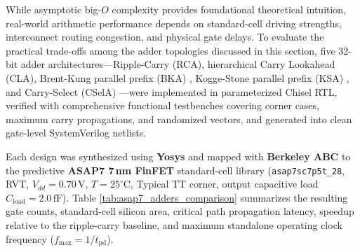 While asymptotic big-$O$ complexity provides foundational theoretical intuition, real-world arithmetic performance depends on standard-cell driving strengths, interconnect routing congestion, and physical gate delays. To evaluate the practical trade-offs among the adder topologies discussed in this section, five 32-bit adder architectures---Ripple-Carry (RCA), hierarchical Carry Lookahead (CLA), Brent-Kung parallel prefix (BKA) \cite{brent1982regular}, Kogge-Stone parallel prefix (KSA) \cite{kogge1973parallel}, and Carry-Select (CSelA) \cite{bedrij1962}---were implemented in parameterized Chisel RTL, verified with comprehensive functional testbenches covering corner cases, maximum carry propagations, and randomized vectors, and generated into clean gate-level SystemVerilog netlists.

Each design was synthesized using \textbf{Yosys} and mapped with \textbf{Berkeley ABC} to the predictive \textbf{ASAP7 7\,nm FinFET} standard-cell library (\texttt{asap7sc7p5t\_28}, RVT, $V_{dd} = 0.70\,\text{V}$, $T = 25^\circ\text{C}$, Typical TT corner, output capacitive load $C_{\text{load}} = 2.0\,\text{fF}$). Table \ref{tab:asap7_adders_comparison} summarizes the resulting gate counts, standard-cell silicon area, critical path propagation latency, speedup relative to the ripple-carry baseline, and maximum standalone operating clock frequency ($f_{\max} = 1 / t_{\text{pd}}$).

\begin{table}[htbp]
\centering
\footnotesize
\setlength{\tabcolsep}{3.5pt}
\caption{Empirical synthesis and timing evaluation of 32-bit high-performance adder architectures mapped to ASAP7 7\,nm FinFET technology.}\label{tab:asap7_adders_comparison}
\end{table}

